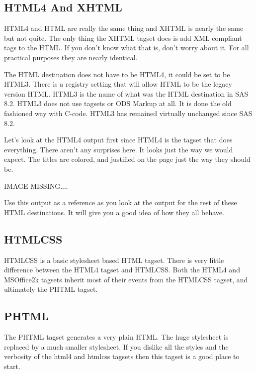 \subsection{HTML4 And XHTML}
HTML4 and HTML are really the same thing and XHTML is nearly the same but not quite.
The only thing the XHTML tagset does is add XML compliant tags to the HTML.
If you don't know what that is, don't worry about it.  For all practical purposes
they are nearly identical.

The HTML destination does not have to be HTML4, it could be set to be HTML3.
There is a registry setting
that will allow HTML to be the legacy version HTML.  HTML3 is
the name of what was the HTML destination in SAS 8.2.  HTML3 does
not use tagsets or ODS Markup at all.  It is done the old fashioned way
with C-code.  HTML3 has remained virtually unchanged since SAS 8.2.

Let's look at the HTML4 output first since HTML4 is the tagset that does everything.
There aren't any surprises here.  It looks just the way we would expect.
The titles are colored, and justified on the page just the way they should be.

IMAGE MISSING....

Use this output as a reference as you look at the output for the rest of these HTML
destinations.  It will give you a good idea of how they all behave.

\subsection{HTMLCSS}
HTMLCSS is a basic stylesheet based HTML tagset.  There is very little difference
between the HTML4 tagset and HTMLCSS. Both the HTML4 and MSOffice2k tagsets inherit
most of their events from the HTMLCSS tagset, and ultimately the PHTML tagset.


\subsection{PHTML}
The PHTML tagset generates a very plain HTML.  The huge stylesheet is replaced
by a much smaller stylesheet.  If you dislike all the styles and the verbosity
of the html4 and htmlcss tagsets then this tagset is a good place to start.


